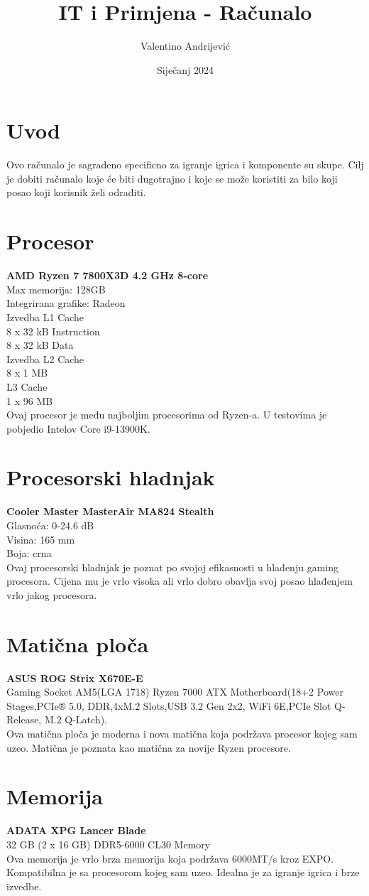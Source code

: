 \documentclass{article}
\title{IT i Primjena - Računalo}
\author{Valentino Andrijević}
\date{Siječanj 2024}
\begin{document}
\maketitle
\section{Uvod}
Ovo računalo je sagrađeno specificno za igranje igrica i komponente su skupe. Cilj je dobiti računalo koje
će biti dugotrajno i koje se može koristiti za bilo koji posao koji korisnik želi odraditi.

\section{Procesor}
\textbf{AMD Ryzen 7 7800X3D 4.2 GHz 8-core}
\\ Max memorija: 128GB
\\ Integrirana grafike: Radeon
\\ Izvedba L1 Cache
\\ 8 x 32 kB Instruction
\\ 8 x 32 kB Data
\\ Izvedba L2 Cache
\\ 8 x 1 MB
\\ L3 Cache
\\ 1 x 96 MB
\\ Ovaj procesor je među najboljim procesorima od Ryzen-a.
U testovima je pobjedio Intelov Core i9-13900K.

\section{Procesorski hladnjak}
\textbf{Cooler Master MasterAir MA824 Stealth}
\\ Glasnoća: 0-24.6 dB
\\ Visina: 165 mm
\\ Boja: crna
\\ Ovaj procesorski hladnjak je poznat po svojoj efikasnosti u hlađenju gaming procesora.
Cijena mu je vrlo visoka ali vrlo dobro obavlja svoj posao hlađenjem vrlo jakog procesora.

\section{Matična ploča}
\textbf{ASUS ROG Strix X670E-E}
\\ Gaming Socket AM5(LGA 1718) Ryzen 7000 ATX Motherboard(18+2 Power Stages,PCIe® 5.0, DDR,4xM.2 Slots,USB 3.2 Gen 2x2, WiFi 6E,PCIe Slot Q-Release, M.2 Q-Latch).
\\ Ova matična ploča je moderna i nova matična koja podržava procesor kojeg sam uzeo. Matična je poznata kao matična za novije Ryzen procesore.

\section{Memorija}
\textbf{ADATA XPG Lancer Blade}
\\ 32 GB (2 x 16 GB) DDR5-6000 CL30 Memory
\\ Ova memorija je vrlo brza memorija koja podržava 6000MT/s kroz EXPO. Kompatibilna je sa procesorom kojeg sam uzeo. Idealna je za igranje igrica i brze izvedbe.

\section{}
\end{document}
